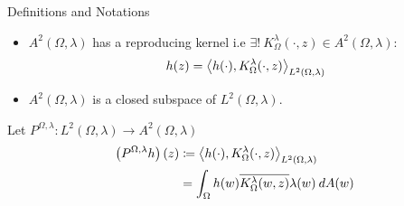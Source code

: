 \documentclass{reu_beamer}
\begin{document}
\begin{frame}{Definitions and Notations}
\begin{itemize}
    \item $A^{2}(\Omega,\lambda)$ has a reproducing kernel i.e \(\exists !\: K_\Omega^\lambda(\cdot,z) \in A^{2}(\Omega,\lambda) :\) 
    \[h(z) = \left\langle h(\cdot), K_\Omega^\lambda(\cdot,z)\right\rangle_{L^2(\Omega, \lambda)}\]
    \item $A^{2}(\Omega,\lambda)$ is a closed subspace of \(L^2(\Omega, \lambda)\).
\end{itemize}
\begin{definition}
    Let \(P^{\Omega,\lambda}: L^2(\Omega,\lambda) \to A^2(\Omega,\lambda)\)
    \begin{align*}
        \left(P^{\Omega,\lambda} h\right)(z) &\coloneq \left\langle h(\cdot), K_\Omega^\lambda(\cdot,z)\right\rangle_{L^2(\Omega, \lambda)} \\
        &= \int_{\Omega} h(w) \overline{K_\Omega^\lambda(w,z)} \lambda(w) \:dA(w)
    \end{align*}
\end{definition}
\end{frame}
\end{document}
